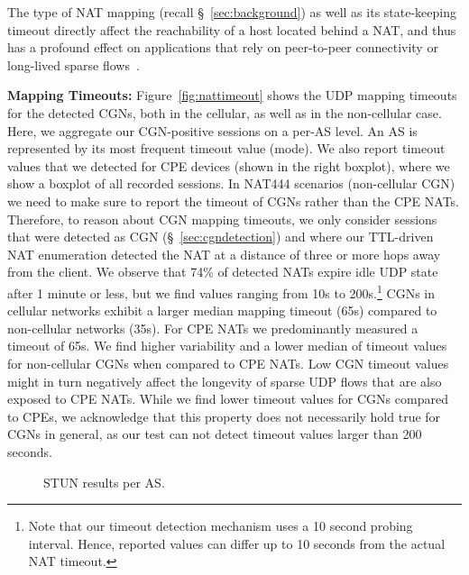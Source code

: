 \documentclass[10pt]{sig-alternate-05-2015}
\newcommand\xref[1]{\S~\ref{#1}}
\newcommand{\parax}[1]{\vspace{0.2em} \noindent \textbf{#1:}}
\begin{document}
{The type of NAT mapping (recall \xref{sec:background}) as well as its
state-keeping timeout directly affect the reachability of a host
located behind a NAT, and thus has a profound effect on applications that rely
on peer-to-peer connectivity \cite{fordHolePunching, d2009measurement} or
long-lived sparse flows~\cite{Wang:2011:USM:2043164.2018479}.

\parax{Mapping Timeouts}
Figure~\ref{fig:nattimeout} shows the UDP mapping timeouts for the 
detected CGNs, both in the cellular, as well as in the non-cellular case. Here, 
we aggregate our CGN-positive sessions on a per-AS level. An AS is 
represented by its most frequent timeout value (mode).
We also report timeout values that we detected for CPE devices (shown in the 
right boxplot), where we show a boxplot of all recorded sessions. In NAT444 
scenarios (non-cellular CGN) we need to make sure to report the timeout of CGNs 
rather than the CPE NATs. Therefore, to reason about CGN mapping timeouts, we 
only consider sessions that were detected as CGN (\xref{sec:cgndetection}) and 
where our TTL-driven NAT enumeration detected the NAT at a distance of three or 
more hops away from the client.
We observe that 74\%{} of detected NATs expire idle UDP 
state after 1 minute or less, but we find values ranging from 10s to 
200s.\footnote{Note that our timeout detection mechanism uses a 10 second 
probing interval. Hence, reported values can differ up to 10 seconds from the 
actual NAT timeout.}
CGNs in cellular networks exhibit a larger median mapping timeout 
(65{}s) compared to non-cellular networks 
(35{}s). For CPE NATs we predominantly measured 
a timeout of 65{}s. We find higher variability and 
a lower median of timeout values for non-cellular CGNs when compared to CPE 
NATs. Low CGN timeout values might in turn negatively affect the longevity of 
sparse UDP flows that are also exposed to CPE NATs. While we find lower timeout 
values for CGNs compared to CPEs, we acknowledge that this property does not 
necessarily hold true for CGNs in general, as our test can not detect timeout 
values larger than 200 seconds.

\begin{figure}
  \begin{center}
\caption{STUN results per AS.}
  \vspace{-1em}
  \label{fig:stun}
  \end{center}
\end{figure}

}
\end{document}
